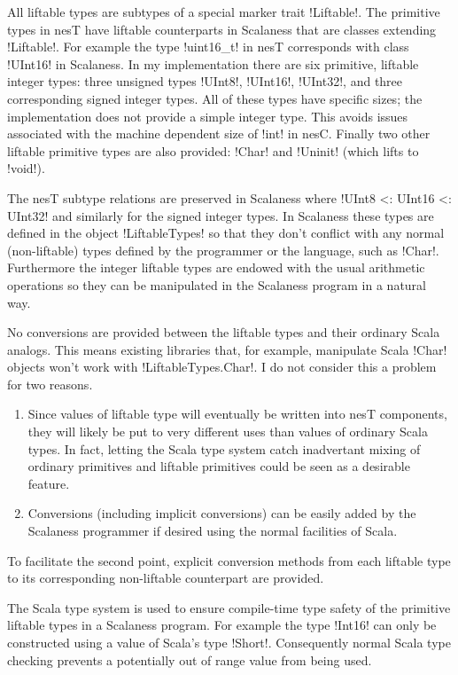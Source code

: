 All liftable types are subtypes of a special marker trait !Liftable!. The primitive types in
nesT have liftable counterparts in Scalaness that are classes extending !Liftable!. For example
the type !uint16\_t! in nesT corresponds with class !UInt16! in Scalaness. In my implementation
there are six primitive, liftable integer types: three unsigned types !UInt8!, !UInt16!,
!UInt32!, and three corresponding signed integer types. All of these types have specific sizes;
the implementation does not provide a simple integer type. This avoids issues associated with
the machine dependent size of !int! in nesC. Finally two other liftable primitive types are also
provided: !Char! and !Uninit! (which lifts to !void!).

The nesT subtype relations are preserved in Scalaness where !UInt8 <: UInt16 <: UInt32! and
similarly for the signed integer types. In Scalaness these types are defined in the object
!LiftableTypes! so that they don't conflict with any normal (non-liftable) types defined by the
programmer or the language, such as !Char!. Furthermore the integer liftable types are endowed
with the usual arithmetic operations so they can be manipulated in the Scalaness program in a
natural way.

No conversions are provided between the liftable types and their ordinary Scala analogs. This
means existing libraries that, for example, manipulate Scala !Char! objects won't work with
!LiftableTypes.Char!. I do not consider this a problem for two reasons.
\begin{enumerate}
\item Since values of liftable type will eventually be written into nesT components, they will
  likely be put to very different uses than values of ordinary Scala types. In fact, letting the
  Scala type system catch inadvertant mixing of ordinary primitives and liftable primitives
  could be seen as a desirable feature.
\item Conversions (including implicit conversions) can be easily added by the Scalaness
  programmer if desired using the normal facilities of Scala.
\end{enumerate}

To facilitate the second point, explicit conversion methods from each liftable type to its
corresponding non-liftable counterpart are provided.

The Scala type system is used to ensure compile-time type safety of the primitive liftable types
in a Scalaness program. For example the type !Int16! can only be constructed using a value of
Scala's type !Short!. Consequently normal Scala type checking prevents a potentially out of
range value from being used.

